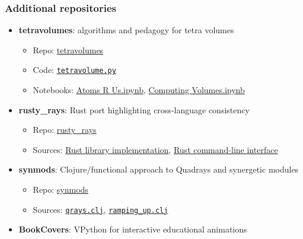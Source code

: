 \documentclass[
]{article}
\providecommand{\tightlist}{%
  \setlength{\itemsep}{0pt}\setlength{\parskip}{0pt}}
\begin{document}
\hypertarget{additional-repositories}{%
\subsubsection{Additional repositories}\label{additional-repositories}}

\begin{itemize}
\tightlist
\item
  \textbf{tetravolumes}: algorithms and pedagogy for tetra volumes

  \begin{itemize}
  \tightlist
  \item
    Repo:
    \href{https://github.com/4dsolutions/tetravolumes}{tetravolumes}
  \item
    Code:
    \href{https://github.com/4dsolutions/tetravolumes/blob/master/tetravolume.py}{\texttt{tetravolume.py}}
  \item
    Notebooks:
    \href{https://raw.githubusercontent.com/4dsolutions/tetravolumes/refs/heads/master/Atoms\%20R\%20Us.ipynb}{Atoms
    R Us.ipynb},
    \href{https://raw.githubusercontent.com/4dsolutions/tetravolumes/refs/heads/master/Computing\%20Volumes.ipynb}{Computing
    Volumes.ipynb}
  \end{itemize}
\item
  \textbf{rusty\_rays}: Rust port highlighting cross-language
  consistency

  \begin{itemize}
  \tightlist
  \item
    Repo: \href{https://github.com/4dsolutions/rusty_rays}{rusty\_rays}
  \item
    Sources:
    \href{https://github.com/4dsolutions/rusty_rays/blob/master/src/lib.rs}{Rust
    library implementation},
    \href{https://github.com/4dsolutions/rusty_rays/blob/master/src/main.rs}{Rust
    command-line interface}
  \end{itemize}
\item
  \textbf{synmods}: Clojure/functional approach to Quadrays and
  synergetic modules

  \begin{itemize}
  \tightlist
  \item
    Repo: \href{https://github.com/4dsolutions/synmods}{synmods}
  \item
    Sources:
    \href{https://github.com/4dsolutions/synmods/blob/master/qrays.clj}{\texttt{qrays.clj}},
    \href{https://github.com/4dsolutions/synmods/blob/master/ramping_up.clj}{\texttt{ramping\_up.clj}}
  \end{itemize}
\item
  \textbf{BookCovers}: VPython for interactive educational animations


\end{itemize}
\end{document}
